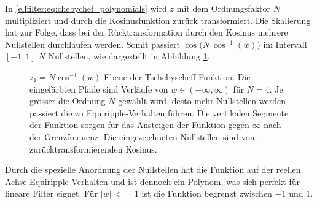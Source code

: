 In \eqref{ellfilter:eq:chebychef_polynomials} wird $z$ mit dem Ordnungsfaktor $N$ multipliziert und durch die Kosinusfunktion zurück transformiert.
Die Skalierung hat zur Folge, dass bei der Rücktransformation durch den Kosinus mehrere Nullstellen durchlaufen werden.
Somit passiert $\cos \big( N~\cos^{-1}(w) \big)$ im Intervall $[-1, 1]$ $N$ Nullstellen, wie dargestellt in Abbildung \ref{ellfilter:fig:arccos2}.
\begin{figure}
    \centering
    
    \caption{
        $z_1=N \cos^{-1}(w)$-Ebene der Tschebyscheff-Funktion.
        Die eingefärbten Pfade sind Verläufe von $w\in(-\infty, \infty)$ für $N = 4$.
        Je grösser die Ordnung $N$ gewählt wird, desto mehr Nullstellen werden passiert die zu Equiripple-Verhalten führen.
        Die vertikalen Segmente der Funktion sorgen für das Ansteigen der Funktion gegen $\infty$ nach der Grenzfrequenz.
        Die eingezeichneten Nullstellen sind vom zurücktransformierenden Kosinus.
    }
    \label{ellfilter:fig:arccos2}
\end{figure}
Durch die spezielle Anordnung der Nullstellen hat die Funktion auf der reellen Achse Equiripple-Verhalten und ist dennoch ein Polynom, was sich perfekt für lineare Filter eignet.
Für $|w| <= 1$ ist die Funktion begrenzt zwischen $-1$ und $1$.
